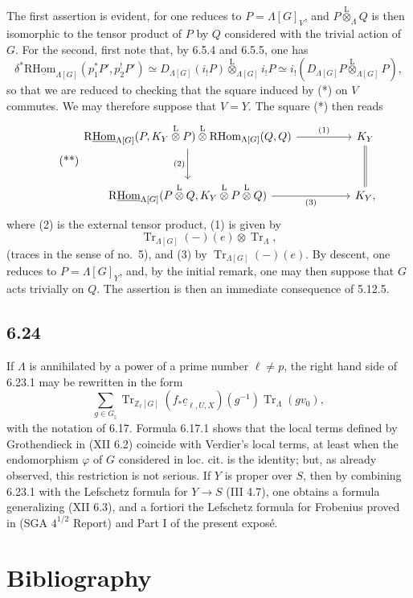 \documentclass[11pt]{article}
\providecommand{\RHom}{\mathrm{RHom}}
\providecommand{\Tr}{\operatorname{Tr}}
\providecommand{\Tr}{\operatorname{Tr}}
\providecommand{\lten}{\overset{\mathrm L}{\otimes}}
\providecommand{\Tr}{\operatorname{Tr}}
\providecommand{\RHom}{\mathrm{RHom}}
\providecommand{\lten}{\overset{\mathrm L}{\otimes}}
\providecommand{\RHom}{\mathrm R\mathcal{H}om}
\providecommand{\lten}{\overset{\mathrm L}{\otimes}}
\providecommand{\Tr}{\operatorname{Tr}}
\providecommand{\lten}{\overset{\mathrm L}{\otimes}}
\providecommand{\lten}{\overset{\mathrm L}{\otimes}}
\providecommand{\lten}{\overset{\mathrm L}{\otimes}}
\providecommand{\RHom}{\mathrm{RHom}}
\providecommand{\Tr}{\operatorname{Tr}}
\providecommand{\lten}{\overset{\mathrm L}{\otimes}}
\begin{document}
The first assertion is evident, for one reduces to $P=\Lambda[G]_V$, and $P\lten_{\Lambda}Q$ is then isomorphic to the tensor product of $P$ by $Q$ considered with the trivial action of $G$. For the second, first note that, by 6.5.4 and 6.5.5, one has
\[
\delta^*\mathrm{R}\underline{\mathrm{Hom}}_{\Lambda[G]}(p_1^*P',p_2^!P')
\simeq
D_{\Lambda[G]}(i_!P)\lten_{\Lambda[G]} i_!P
\simeq
i_!(D_{\Lambda[G]}P\lten_{\Lambda[G]}P),
\]
so that we are reduced to checking that the square induced by (*) on $V$ commutes. We may therefore suppose that $V=Y$. The square (*) then reads
\begin{equation}\tag{**}
\begin{tikzcd}[column sep=huge,row sep=large]
\mathrm{R}\underline{\mathrm{Hom}}_{\Lambda[G]}(P,K_Y\lten P)\lten\RHom_{\Lambda[G]}(Q,Q) \arrow[r,"(1)"] \arrow[d,"(2)"']
& K_Y \arrow[d,equal]\\
\mathrm{R}\underline{\mathrm{Hom}}_{\Lambda[G]}(P\lten Q,K_Y\lten P\lten Q) \arrow[r,"(3)"']
& K_Y ,
\end{tikzcd}
\end{equation}
where (2) is the external tensor product, (1) is given by
\[
\Tr_{\Lambda[G]}(-)(e)\otimes\Tr_{\Lambda},
\]
(traces in the sense of no.~5), and (3) by $\Tr_{\Lambda[G]}(-)(e)$. By descent, one reduces to $P=\Lambda[G]_Y$, and, by the initial remark, one may then suppose that $G$ acts trivially on $Q$. The assertion is then an immediate consequence of 5.12.5.

\subsection*{6.24}
If $\Lambda$ is annihilated by a power of a prime number $\ell\ne p$, the right hand side of 6.23.1 may be rewritten in the form
\[
\sum_{g\in G_{\natural}}
\Tr_{\mathbb Z_{\ell}[G]}(f_*\underline c_{\ell,U,X})(g^{-1})
\Tr_{\Lambda}(gv_0),
\]
with the notation of 6.17. Formula 6.17.1 shows that the local terms defined by Grothendieck in (XII 6.2) coincide with Verdier's local terms, at least when the endomorphism $\varphi$ of $G$ considered in loc. cit. is the identity; but, as already observed, this restriction is not serious. If $Y$ is proper over $S$, then by combining 6.23.1 with the Lefschetz formula for $Y\to S$ (III 4.7), one obtains a formula generalizing (XII 6.3), and a fortiori the Lefschetz formula for Frobenius proved in (SGA $4^{1/2}$ Report) and Part I of the present exposé.

\section*{Bibliography}
\end{document}
